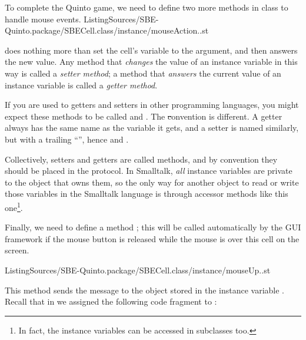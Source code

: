 \documentclass[a4paper,10pt,twoside]{book}
\begin{document}
To complete the Quinto game, we need to define two more methods in class  to handle mouse events.
%
{ListingSources/SBE-Quinto.package/SBECell.class/instance/mouseAction..st}

 does nothing more than set the cell's  variable to the argument, and then answers the new value.
Any method that \emph{changes} the value of an instance variable in this way is called a \emph{setter method}; a method that \emph{answers} the current value of an instance variable is called a \emph{getter method}.

If you are used to getters and setters in other programming languages, you might expect these methods to be called  and .
The \st convention is different.
A getter always has the same name as the variable it gets, and a setter is named similarly, but with a trailing ``\ct{:}'', hence  and .

Collectively, setters and getters are called  methods\cite{Klim96a}, and by convention they should be placed in the  protocol.
In Smalltalk, \emph{all} instance variables are private to the object that owns them, so the only way for another object to read or write those variables in the Smalltalk language is through accessor methods like this one\footnote{%
	In fact, the instance variables can be accessed in subclasses too.%
}.


Finally, we need to define a method ; this will be called automatically by the GUI framework if the mouse button is released while the mouse is over this cell on the screen.

%
{ListingSources/SBE-Quinto.package/SBECell.class/instance/mouseUp..st}


This method sends the message  to the object stored in the instance variable .
Recall that in  we assigned the following code fragment to :
\end{document}
